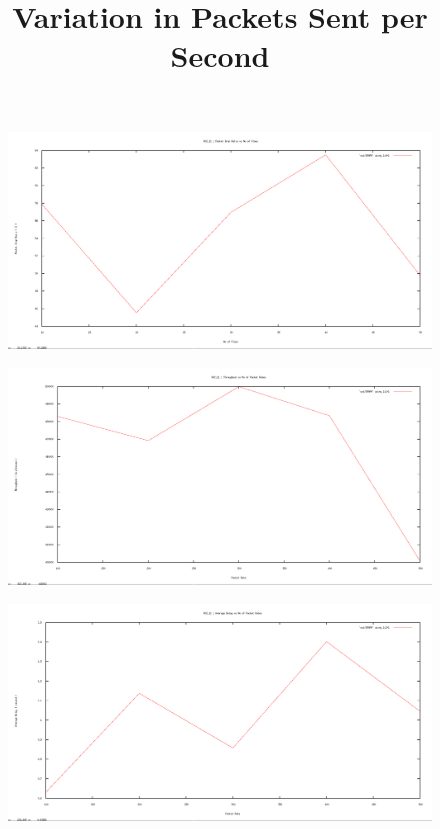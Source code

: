 \documentclass[12pt]{article}
\begin{document}
\begin{figure}[H]
	\centering
	\includegraphics[scale=	0.26]{image/802.11/Packetdropratio_vs_flows.png}
\end{figure}


\newpage
\title{Variation in Packets Sent per Second}
\begin{figure}[H]
	\centering
	\includegraphics[scale=	0.26]{image/802.11/Throughput_vs_packetRates.png}
\end{figure}

\begin{figure}[H]
	\centering
	\includegraphics[scale=	0.26]{image/802.11/Averagedelay_vs_packetRates.png}
\end{figure}
\end{document}

